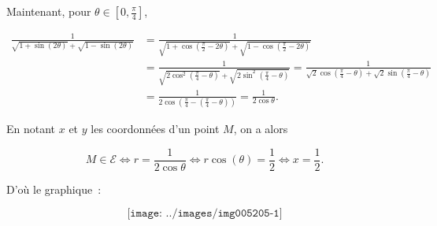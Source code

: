 {{Maintenant, pour $\theta\in[0,\frac{\pi}{4}]$,

\begin{align*}
\frac{1}{\sqrt{1+\sin(2\theta)}+\sqrt{1-\sin(2\theta)}}&=
\frac{1}{\sqrt{1+\cos(\frac{\pi}{2}-2\theta)}+\sqrt{1-\cos(\frac{\pi}{2}-2\theta)}}\\
 &=\frac{1}{\sqrt{2\cos^2(\frac{\pi}{4}-\theta)}+\sqrt{2\sin^2(\frac{\pi}{4}-\theta)}}
 =\frac{1}{\sqrt{2}\cos(\frac{\pi}{4}-\theta)+\sqrt{2}\sin(\frac{\pi}{4}-\theta)}\\
 &=\frac{1}{2\cos(\frac{\pi}{4}-(\frac{\pi}{4}-\theta))}=\frac{1}{2\cos\theta}.
\end{align*}

En notant $x$ et $y$ les coordonnées d'un point $M$, on a alors 

$$M\in\mathcal{E}\Leftrightarrow r=\frac{1}{2\cos\theta}\Leftrightarrow r\cos(\theta)=\frac{1}{2}\Leftrightarrow x=\frac{1}{2}.$$

D'où le graphique~:

$$\texttt{[image: ../images/img005205-1]}$$}
}